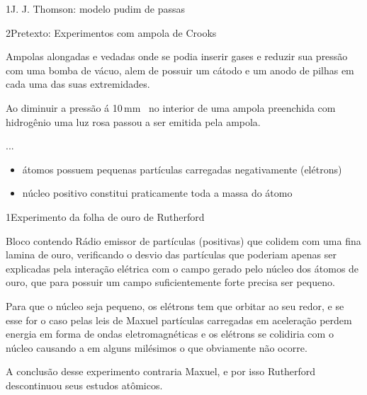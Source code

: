 \begin{sectionBox}1{J. J. Thomson: modelo pudim de passas}

    \begin{sectionBox}2{Pretexto: Experimentos com ampola de Crooks}

        Ampolas alongadas e vedadas onde se podia inserir gases e reduzir sua pressão com uma bomba de vácuo, alem de possuir um cátodo e um anodo de pilhas em cada uma das suas extremidades.

        Ao diminuir a pressão á 10\,\unit{\milli\meter{}} no interior de uma ampola preenchida com hidrogênio uma luz rosa passou a ser emitida pela ampola.

        ...


    \end{sectionBox}

    \begin{itemize}
        \item átomos possuem pequenas partículas carregadas negativamente (elétrons)
        \item núcleo positivo constitui praticamente toda a massa do átomo
    \end{itemize}

\end{sectionBox}



\begin{sectionBox}1{Experimento da folha de ouro de Rutherford}

    Bloco contendo Rádio emissor de partículas \alpha (positivas) que colidem com uma fina lamina de ouro, verificando o desvio das partículas \alpha que poderiam apenas ser explicadas pela interação elétrica com o campo gerado pelo núcleo dos átomos de ouro, que para possuir um campo suficientemente forte precisa ser pequeno.

    Para que o núcleo seja pequeno, os elétrons tem que orbitar ao seu redor, e se esse for o caso pelas leis de Maxuel partículas carregadas em aceleração perdem energia em forma de ondas eletromagnéticas e os elétrons se colidiria com o núcleo causando a %
    em alguns milésimos o que obviamente não ocorre.

    A conclusão desse experimento contraria Maxuel, e por isso Rutherford descontinuou seus estudos atômicos.

\end{sectionBox}

